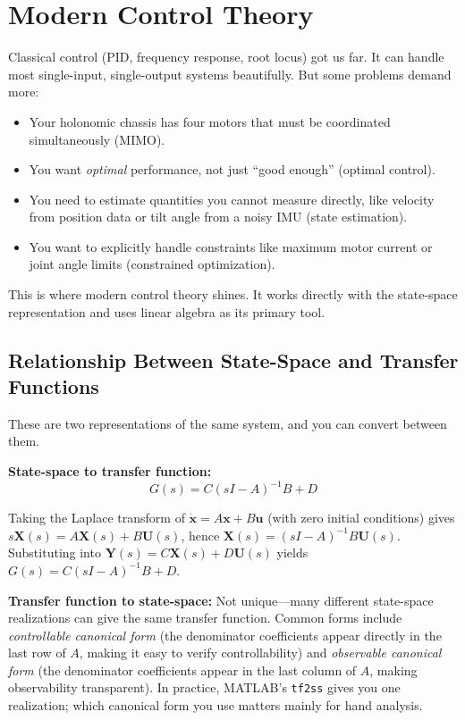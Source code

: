 \section{Modern Control Theory}

Classical control (PID, frequency response, root locus) got us far. It can handle most single-input, single-output systems beautifully. But some problems demand more:

\begin{itemize}
    \item Your holonomic chassis has four motors that must be coordinated simultaneously (MIMO).
    \item You want \textit{optimal} performance, not just ``good enough'' (optimal control).
    \item You need to estimate quantities you cannot measure directly, like velocity from position data or tilt angle from a noisy IMU (state estimation).
    \item You want to explicitly handle constraints like maximum motor current or joint angle limits (constrained optimization).
\end{itemize}

This is where modern control theory shines. It works directly with the state-space representation and uses linear algebra as its primary tool.

\subsection{Relationship Between State-Space and Transfer Functions}

These are two representations of the same system, and you can convert between them.

\textbf{State-space to transfer function:}
\begin{equation}
G(s) = C(sI - A)^{-1}B + D
\end{equation}

Taking the Laplace transform of $\dot{\mathbf{x}} = A\mathbf{x} + B\mathbf{u}$ (with zero initial conditions) gives $s\mathbf{X}(s) = A\mathbf{X}(s) + B\mathbf{U}(s)$, hence $\mathbf{X}(s) = (sI - A)^{-1}B\mathbf{U}(s)$. Substituting into $\mathbf{Y}(s) = C\mathbf{X}(s) + D\mathbf{U}(s)$ yields $G(s) = C(sI-A)^{-1}B + D$.

\textbf{Transfer function to state-space:} Not unique---many different state-space realizations can give the same transfer function. Common forms include \textit{controllable canonical form} (the denominator coefficients appear directly in the last row of $A$, making it easy to verify controllability) and \textit{observable canonical form} (the denominator coefficients appear in the last column of $A$, making observability transparent). In practice, MATLAB's \texttt{tf2ss} gives you one realization; which canonical form you use matters mainly for hand analysis.

